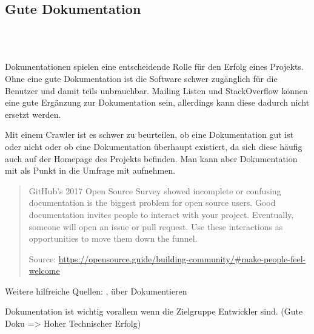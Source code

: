 \subsection{Gute Dokumentation}

 \\
 \\

Dokumentationen spielen eine entscheidende Rolle für den Erfolg eines Projekts.
Ohne eine gute Dokumentation ist die Software schwer zugänglich für die Benutzer und damit teils
unbrauchbar.
Mailing Listen und StackOverflow können eine gute Ergänzung zur Dokumentation sein, allerdings kann
diese dadurch nicht ersetzt werden.\\ 


Mit einem Crawler ist es schwer zu beurteilen, ob eine Dokumentation gut ist oder nicht oder ob
eine Dokumentation überhaupt existiert, da sich diese häufig auch auf der Homepage des Projekts befinden.
Man kann aber Dokumentation mit als Punkt in die Umfrage mit aufnehmen.

\begin{quote}
    GitHub's 2017 Open Source Survey showed incomplete or confusing documentation is the biggest
    problem for open source users. Good documentation invites people to interact with your project. 
    Eventually, someone will open an issue or pull request. Use these interactions as opportunities 
    to move them down the funnel.

    \tiny
    Source: \url{https://opensource.guide/building-community/#make-people-feel-welcome}
    \normalsize

\end{quote}

Weitere hilfreiche Quellen: ,
 über Dokumentieren

\bigskip



\begin{hypothesis}
    Dokumentation ist wichtig vorallem wenn die Zielgruppe Entwickler sind.
    (Gute Doku => Hoher Technischer Erfolg)
\end{hypothesis}